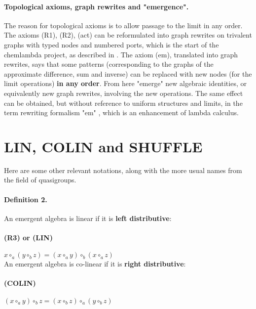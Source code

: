 \documentclass{article}
\begin{document}
\paragraph{Topological axioms, graph rewrites and "emergence".} The reason for topological axioms is to allow passage to the limit in any order. The axioms (R1), (R2), (act) can be reformulated into graph rewrites on trivalent graphs with typed nodes and numbered ports, which is the start of the chemlambda project, as described in \cite{buligahis}.  The axiom (em), translated into graph rewrites, says that some patterns (corresponding to the graphs of the approximate difference, sum and inverse) can be replaced with new nodes (for the limit operations) {\bf in any order}. From here "emerge" new algebraic identities, or equivalently new graph rewrites, involving the new operations. The same effect can be obtained, but without reference to uniform structures and limits, in the term rewriting formalism "em" \cite{buligaem}, which is an enhancement of lambda calculus. \\


\section{LIN, COLIN and SHUFFLE}

Here are some other relevant notations, along with the more usual names from the field of quasigroups.


\paragraph{Definition 2.} An emergent algebra is linear if it is {\bf left distributive}:\\ 

\paragraph{ (R3) or (LIN)} $\displaystyle x \circ_{a} (y \circ_{b} z) = (x \circ_{a} y) \circ_{b} (x \circ_{a} z)$ \\

\noindent An emergent algebra is co-linear if it is {\bf right distributive}:\\ 

\paragraph{(COLIN)} $\displaystyle (x \circ_{a} y) \circ_{b} z = (x \circ_{b} z) \circ_{a} (y \circ_{b} z)$ \\
\end{document}
